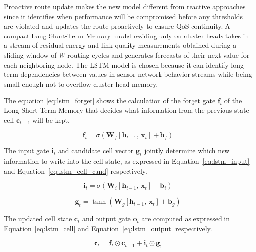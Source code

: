 \documentclass[a4paper,fleqn]{cas-dc}
\numberwithin{equation}{section}
\begin{document}
Proactive route update makes the new model different from
reactive approaches since it identifies when performance will be
compromised before any thresholds are violated and updates the
route proactively to ensure QoS continuity.
\cite{R7_Baral2024AdaptiveEndToEndIoT,R8_Mahanipour2024FeatureEngineeringIDS}
A compact Long Short-Term Memory model residing only on cluster heads takes in a stream of residual energy and link
quality measurements obtained during a sliding window of $W$ routing cycles and generates forecasts of their next value for
each neighboring node. The LSTM model is chosen because it can
identify long-term dependencies between values in sensor network
behavior streams while being small enough not to overflow cluster
head memory.

The equation \ref{eq:lstm_forget} shows the calculation of the
forget gate $\mathbf{f}_t$ of the Long Short-Term Memory
that decides what information from the previous state cell $\mathbf{c}_{t-1}$ will be kept.

\begin{equation}
\label{eq:lstm_forget}
\mathbf{f}_t = \sigma\!\left(
\mathbf{W}_f \left[\mathbf{h}_{t-1},\, \mathbf{x}_t\right]
+ \mathbf{b}_f \right)
\end{equation}

The input gate $\mathbf{i}_t$ and candidate cell vector
$\mathbf{g}_t$ jointly determine which new information to write into
the cell state, as expressed in Equation~\ref{eq:lstm_input} and
Equation~\ref{eq:lstm_cell_cand} respectively.

\begin{equation}
\label{eq:lstm_input}
\mathbf{i}_t = \sigma\!\left(
\mathbf{W}_i \left[\mathbf{h}_{t-1},\, \mathbf{x}_t\right]
+ \mathbf{b}_i \right)
\end{equation}

\begin{equation}
\label{eq:lstm_cell_cand}
\mathbf{g}_t = \tanh\!\left(
\mathbf{W}_g \left[\mathbf{h}_{t-1},\, \mathbf{x}_t\right]
+ \mathbf{b}_g \right)
\end{equation}

The updated cell state $\mathbf{c}_t$ and output gate $\mathbf{o}_t$
are computed as expressed in Equation~\ref{eq:lstm_cell} and
Equation~\ref{eq:lstm_output} respectively.

\begin{equation}
\label{eq:lstm_cell}
\mathbf{c}_t = \mathbf{f}_t \odot \mathbf{c}_{t-1}
             + \mathbf{i}_t \odot \mathbf{g}_t
\end{equation}
\end{document}
